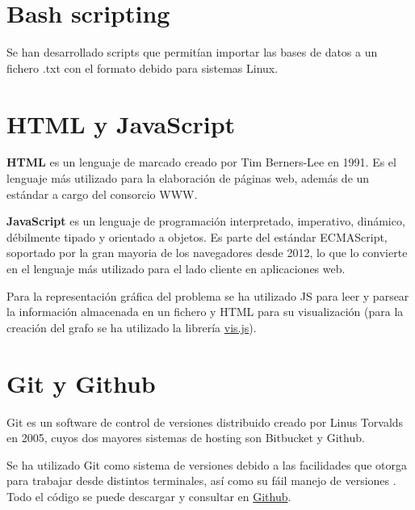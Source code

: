 \section{Bash scripting}
Se han desarrollado scripts que permitían importar las bases de datos a un fichero .txt con el formato debido para sistemas Linux. 

\section{HTML y JavaScript}
\textbf{HTML} es un lenguaje de marcado  creado por Tim Berners-Lee en 1991. Es el lenguaje más utilizado para la elaboración de páginas web, además de un estándar a cargo del consorcio WWW.

\textbf{JavaScript} es un lenguaje de programación interpretado, imperativo, dinámico, débilmente tipado y  orientado a objetos. Es parte del estándar ECMAScript, soportado por la gran mayoria de los navegadores desde 2012, lo que lo convierte en el lenguaje más utilizado para el lado cliente en aplicaciones web.

Para la representación gráfica del problema se ha utilizado JS para leer y parsear la información almacenada en un fichero y HTML para su visualización (para la creación del grafo se ha utilizado la librería \href{http://visjs.org/docs/network/}{vis.js}).

\section{Git y Github}
Git es un software de control de versiones distribuido creado por Linus Torvalds en 2005, cuyos dos mayores sistemas de hosting son Bitbucket y Github.

Se ha utilizado Git como sistema de versiones debido a las facilidades que otorga para trabajar desde distintos terminales, así como su fáil manejo de versiones . Todo el código se puede descargar y consultar en  \href{https://github.com/cavasanchez/TFG}{Github}.

